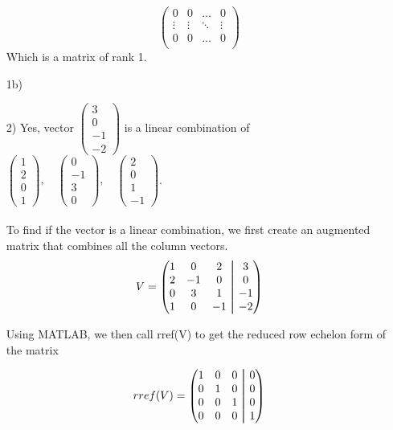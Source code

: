 \documentclass{article}
\newcommand\aug{\fboxsep=-\fboxrule\!\!\!\fbox{\strut}\!\!\!}
\begin{document}
\begin{enumerate}
$$\begin{pmatrix}
        0 & 0 & \dots & 0 \\
        \vdots & \vdots & \ddots & \vdots \\
        0 & 0 & \dots & 0 \\
    \end{pmatrix}
    $$
    Which is a matrix of rank 1.
    \item[1b)]
    \item[2)] Yes, vector 
    $\left( \begin{array}{r} 3 \\ 0 \\ -1 \\ -2 \end{array} \right)$
     is a linear combination of 
    $ \left( \begin{array}{r} 1 \\ 2 \\ 0 \\ 1 \end{array} \right), \quad   
    \left( \begin{array}{r} 0 \\ -1 \\ 3 \\ 0 \end{array} \right), 
    \quad\left( \begin{array}{r} 2 \\ 0 \\ 1 \\ -1\end{array} \right)$. 
    \\\\To find if the vector is a linear combination, we first create an augmented matrix that combines all the column vectors. 
    $$
    V =
    \begin{pmatrix}
    1 & 0 & 2 & \aug & 3\\
    2 & -1 & 0 & \aug & 0\\
    0 & 3 & 1 & \aug & -1\\
    1 & 0 & -1 & \aug & -2\\
    \end{pmatrix}
    $$

    Using MATLAB, we then call rref(V) to get the reduced row echelon form of the matrix

    $$
    rref(V) =
    \begin{pmatrix}
    1 & 0 & 0 & \aug & 0\\
    0 & 1 & 0 & \aug & 0\\
    0 & 0 & 1 & \aug & 0\\
    0 & 0 & 0 & \aug & 1\\
    \end{pmatrix}
    $$


\end{enumerate}
\end{document}
